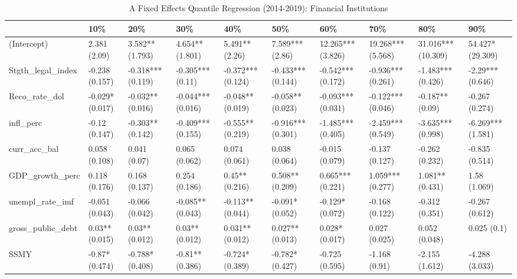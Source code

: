\begin{table}[ht]
\centering
\caption{A Fixed Effects Quantile Regression (2014-2019): Financial Institutions} 
\begingroup\small
\begin{tabular}{llllllllll}
  \toprule
 & 10\% & 20\% & 30\% & 40\% & 50\% & 60\% & 70\% & 80\% & 90\% \\ 
  \midrule
(Intercept) & 2.381 (2.09) & 3.582** (1.793) & 4.654** (1.801) & 5.491** (2.26) & 7.589*** (2.86) & 12.265*** (3.826) & 19.268*** (5.568) & 31.016*** (10.309) & 54.427* (29.309) \\ 
  Stgth\_legal\_index & -0.238 (0.157) & -0.318*** (0.119) & -0.305*** (0.11) & -0.372*** (0.124) & -0.433*** (0.144) & -0.542*** (0.172) & -0.936*** (0.261) & -1.483*** (0.426) & -2.29*** (0.646) \\ 
  Reco\_rate\_dol & -0.029* (0.017) & -0.032** (0.016) & -0.044*** (0.016) & -0.048** (0.019) & -0.058** (0.023) & -0.093*** (0.031) & -0.122*** (0.046) & -0.187** (0.09) & -0.267 (0.274) \\ 
  infl\_perc & -0.12 (0.147) & -0.303** (0.142) & -0.409*** (0.155) & -0.555** (0.219) & -0.916*** (0.301) & -1.485*** (0.405) & -2.459*** (0.549) & -3.635*** (0.998) & -6.269*** (1.581) \\ 
  curr\_acc\_bal & 0.058 (0.108) & 0.041 (0.07) & 0.065 (0.062) & 0.074 (0.061) & 0.038 (0.064) & -0.015 (0.079) & -0.137 (0.127) & -0.262 (0.232) & -0.835 (0.514) \\ 
  GDP\_growth\_perc & 0.118 (0.176) & 0.168 (0.137) & 0.254 (0.186) & 0.45** (0.216) & 0.508** (0.209) & 0.665*** (0.221) & 1.059*** (0.277) & 1.081** (0.431) & 1.58 (1.069) \\ 
  unempl\_rate\_imf & -0.051 (0.043) & -0.066 (0.042) & -0.085** (0.043) & -0.113** (0.044) & -0.091* (0.052) & -0.129* (0.072) & -0.168 (0.122) & -0.312 (0.351) & -0.267 (0.612) \\ 
  gross\_public\_debt & 0.03** (0.015) & 0.03** (0.012) & 0.03** (0.012) & 0.031** (0.012) & 0.027** (0.013) & 0.028* (0.017) & 0.027 (0.025) & 0.052 (0.048) & 0.025 (0.1) \\ 
  SSMY & -0.87* (0.474) & -0.788* (0.408) & -0.81** (0.386) & -0.724* (0.389) & -0.782* (0.427) & -0.725 (0.595) & -1.168 (0.91) & -2.155 (1.612) & -4.288 (3.033) \\ 
   \bottomrule
\end{tabular}
\endgroup
\end{table}
